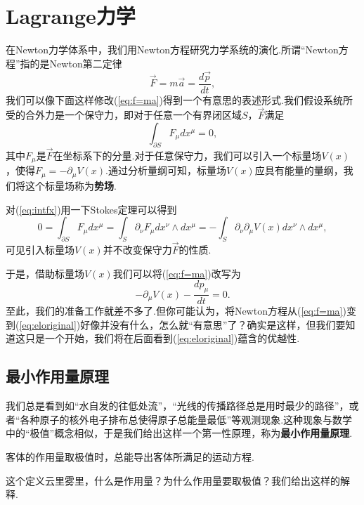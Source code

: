 \section{Lagrange力学}\label{sec:Lagrange}
	在Newton力学体系中，我们用Newton方程研究力学系统的演化.所谓“Newton方程”指的是Newton第二定律
	\begin{equation}\label{eq:f=ma}
		\overrightarrow{F} =m\overrightarrow{a}=\frac{d\overrightarrow{p}}{dt},
	\end{equation}
	我们可以像下面这样修改(\ref{eq:f=ma})得到一个有意思的表述形式.我们假设系统所受的合外力是一个保守力，即对于任意一个有界闭区域$S$，$\overrightarrow{F}$满足
	\begin{equation}\label{eq:intfx}
		\int _{\partial S}F_\mu dx^\mu=0,
	\end{equation}
	其中$F_\mu$是$\overrightarrow{F}$在坐标系下的分量.对于任意保守力，我们可以引入一个标量场$V(x)$，使得$F_\mu=-\partial_\mu V(x)$.通过分析量纲可知，标量场$V(x)$应具有能量的量纲，我们将这个标量场称为\textbf{势场}.
	\begin{remark}
		对(\ref{eq:intfx})用一下Stokes定理可以得到
		$$0=\int_{\partial S}F_\mu dx^\mu=\int_S \partial_\nu F_\mu dx^\nu\wedge dx^\mu=-\int_S\partial_\nu \partial_\mu V(x) dx^\nu\wedge dx^\mu,$$
		可见引入标量场$V(x)$并不改变保守力$\overrightarrow{F}$的性质.
	\end{remark}
	于是，借助标量场$V(x)$我们可以将(\ref{eq:f=ma})改写为
	\begin{equation}\label{eq:eloriginal}
		-\partial_\mu V(x)-\frac{dp_\mu}{dt}=0.
	\end{equation}
	至此，我们的准备工作就差不多了.但你可能认为，将Newton方程从(\ref{eq:f=ma})变到(\ref{eq:eloriginal})好像并没有什么，怎么就“有意思”了？确实是这样，但我们要知道这只是一个开始，我们将在后面看到(\ref{eq:eloriginal})蕴含的优越性.
	\subsection{最小作用量原理}
		我们总是看到如“水自发的往低处流”，“光线的传播路径总是用时最少的路径”，或者“各种原子的核外电子排布总使得原子总能量最低”等观测现象.这种现象与数学中的“极值”概念相似，于是我们给出这样一个第一性原理，称为\textbf{最小作用量原理}.
		\begin{definition}
			客体的作用量取极值时，总能导出客体所满足的运动方程.
		\end{definition}
		这个定义云里雾里，什么是作用量？为什么作用量要取极值？我们给出这样的解释.
		
